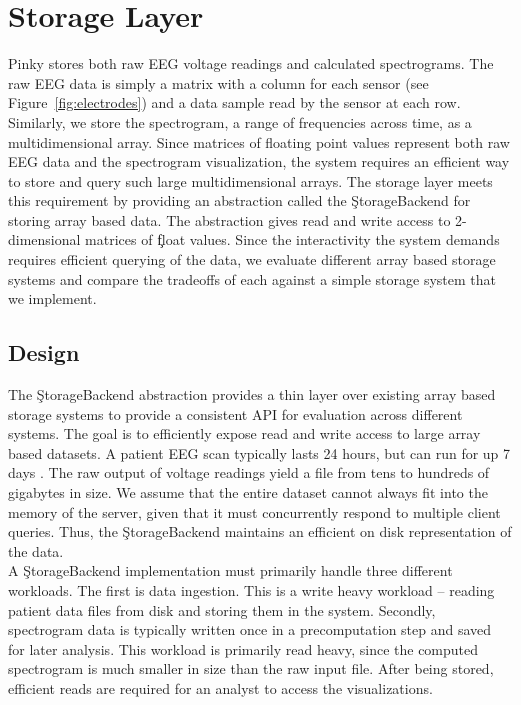 \chapter{Storage Layer}\label{storage-ch}

Pinky stores both raw EEG voltage readings and calculated spectrograms. The raw
EEG data is simply a matrix with a column for each sensor (see
Figure~\ref{fig:electrodes}) and a data sample read by the sensor at each row.
Similarly, we store the spectrogram, a range of frequencies across time, as a
multidimensional array. Since matrices of floating point values represent both
raw EEG data and the spectrogram visualization, the system requires an
efficient way to store and query such large multidimensional arrays. The
storage layer meets this requirement by providing an abstraction called the
\c{StorageBackend} for storing array based data. The abstraction gives read and
write access to 2-dimensional matrices of \c{float} values. Since the
interactivity the system demands requires efficient querying of the data, we
evaluate different array based storage systems and compare the tradeoffs of
each against a simple storage system that we implement.

\section{Design}

The \c{StorageBackend} abstraction provides a thin layer over existing array
based storage systems to provide a consistent API for evaluation across
different systems. The goal is to efficiently expose read and write access to
large array based datasets. A patient EEG scan typically lasts 24 hours, but
can run for up 7 days \cite{ceeg-3}. The raw output of voltage readings yield a
file from tens to hundreds of gigabytes in size. We assume that the entire
dataset cannot always fit into the memory of the server, given that it must
concurrently respond to multiple client queries. Thus, the \c{StorageBackend}
maintains an efficient on disk representation of the data. \\

A \c{StorageBackend} implementation must primarily handle three different
workloads. The first is data ingestion. This is a write heavy workload --
reading patient data files from disk and storing them in the system. Secondly,
spectrogram data is typically written once in a precomputation step and saved
for later analysis. This workload is primarily read heavy, since the computed
spectrogram is much smaller in size than the raw input file.  After being
stored, efficient reads are required for an analyst to access the
visualizations.

